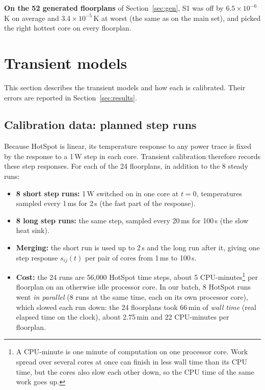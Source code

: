 \documentclass[11pt,a4paper]{article}
\begin{document}
\textbf{On the 52 generated floorplans} of Section~\ref{sec:gen}, S1 was off by
$6.5\times10^{-6}$\,K on average and $3.4\times10^{-5}$\,K at worst (the same as on the main set),
and picked the right hottest core on every floorplan.

\section{Transient models}\label{sec:models}
This section describes the transient models and how each is calibrated. Their errors are reported
in Section~\ref{sec:results}.

\subsection{Calibration data: planned step runs}\label{sec:steps}
Because HotSpot is linear, its temperature response to any power trace is fixed by the response
to a 1\,W step in each core. Transient calibration therefore records these step responses. For each
of the 24 floorplans, in addition to the 8 steady runs:
\begin{itemize}
  \item \textbf{8 short step runs:} 1\,W switched on in one core at $t = 0$, temperatures sampled
        every 1\,ms for 2\,s (the fast part of the response).
  \item \textbf{8 long step runs:} the same step, sampled every 20\,ms for 100\,s (the slow heat
        sink).
  \item \textbf{Merging:} the short run is used up to 2\,s and the long run after it, giving one
        step response $s_{ij}(t)$ per pair of cores from 1\,ms to 100\,s.
  \item \textbf{Cost:} the 24 runs are 56{,}000 HotSpot time steps, about 5
        CPU-minutes\footnote{A CPU-minute is one minute of computation on one processor core.
        Work spread over several cores at once can finish in less wall time than its CPU time,
        but the cores also slow each other down, so the CPU time of the same work goes up.} per
        floorplan on an otherwise idle processor core. In our batch, 8 HotSpot runs went
        \emph{in parallel} (8 runs at the same time, each on its own processor core), which
        slowed each run down: the 24 floorplans took 66\,min of \emph{wall time} (real elapsed
        time on the clock), about 2.75\,min and 22 CPU-minutes per floorplan.
\end{itemize}
\end{document}
